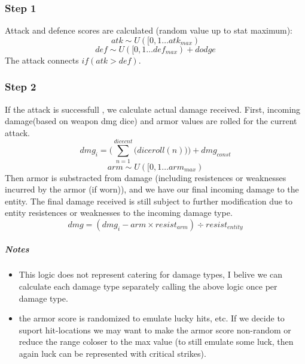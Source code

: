\documentclass[a4paper,10pt]{book}
\begin{document}
\subsubsection*{Step 1}
Attack and defence scores are calculated (random value up to stat maximum):
\begin{equation*} atk \sim U([0,1 \dots atk_{max}) \end{equation*}
\begin{equation*} def \sim U([0,1 \dots def_{max}) + dodge\end{equation*}
The attack connects \begin{math} if(atk > def) \end{math}. 
\subsubsection*{Step 2}
If the attack is successfull , we calculate actual damage received. First,
incoming damage(based on weapon dmg dice) and armor values are rolled for the
current attack.
\begin{equation*}
  dmg_i =
  \Big(
    \sum\limits_{n=1}^{dicecnt}\big(diceroll(n)\big)
  \Big) + dmg_{const}
\end{equation*}
\begin{equation*} arm \sim U([0,1 \dots arm_{max}) \end{equation*}
Then armor is substracted from damage (including resistences or weaknesses
incurred by the armor (if worn)), and we have our final incoming damage to the
entity.  The final damage received is still subject to further modification due
to entity resistences or weaknesses to the incoming damage type.
\begin{equation*}
  dmg = (dmg_i - arm \times resist_{arm}) \div resist_{entity}
\end{equation*}

\subparagraph*{Notes}
\begin{itemize}
  \item This logic does not represent catering for damage types, I belive we can
    calculate each damage type separately calling the above logic once per
    damage type.
  \item the armor score is randomized to emulate lucky hits, etc. If we decide
    to suport hit-locations we may want to make the armor score non-random or
    reduce the range coloser to the max value (to still emulate some luck, then
    again luck can be represented with critical strikes).
\end{itemize}
\end{document}
